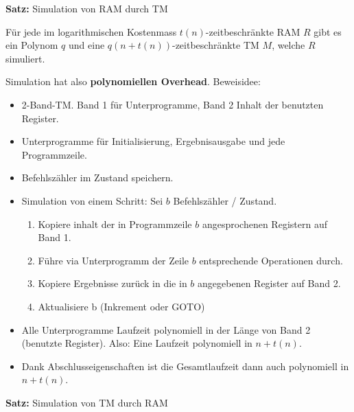 \documentclass[a4paper,graphics,11pt]{article}
\begin{document}
\textbf{Satz:} Simulation von RAM durch TM

Für jede im logarithmischen Kostenmass $t(n)$-zeitbeschränkte RAM $R$ gibt es ein Polynom $q$
und eine $q(n + t(n))$-zeitbeschränkte TM $M$, welche $R$ simuliert.

Simulation hat also \textbf{polynomiellen Overhead}. Beweisidee:
\begin{itemize}
    \item 2-Band-TM. Band 1 für Unterprogramme, Band 2 Inhalt der benutzten Register.
    \item Unterprogramme für Initialisierung, Ergebnisausgabe und jede Programmzeile.
    \item Befehlszähler im Zustand speichern.
    \item Simulation von einem Schritt: Sei $b$ Befehlszähler / Zustand.
        \begin{enumerate}
            \item Kopiere inhalt der in Programmzeile $b$ angesprochenen Registern auf Band 1.
            \item Führe via Unterprogramm der Zeile $b$ entsprechende Operationen durch.
            \item Kopiere Ergebnisse zurück in die in $b$ angegebenen Register auf Band 2.
            \item Aktualisiere b (Inkrement oder GOTO)
        \end{enumerate}
    \item Alle Unterprogramme Laufzeit polynomiell in der Länge von Band 2 (benutzte
        Register). Also: Eine Laufzeit polynomiell in $n + t(n)$.
    \item Dank Abschlusseigenschaften ist die Gesamtlaufzeit dann
        auch polynomiell in $n+ t(n)$.
\end{itemize}

\strut

\textbf{Satz:} Simulation von TM durch RAM
\end{document}
